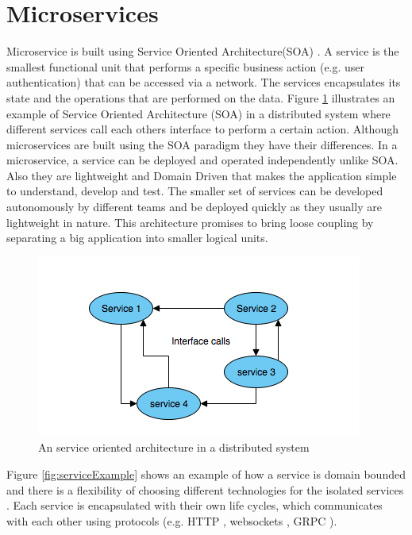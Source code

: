 \newpage
\section{Microservices}

Microservice is built using Service Oriented Architecture(SOA) \cite[chapter ~3]{SOA}. A service 
is the smallest functional unit that performs a specific business action (e.g. user authentication) that can be accessed via a network. 
The services encapsulates its state and the operations that are performed on the data.  
Figure \ref{fig:objectBasedDS} illustrates an example of Service Oriented Architecture (SOA) in a distributed system where different services call each others interface
to perform a certain action. Although microservices are built using the SOA paradigm they have their differences. In a microservice, a service can be deployed and 
operated independently unlike SOA.
Also they are lightweight and Domain Driven \cite{DDD} that makes the application simple to understand, develop and test. The smaller set of services
can be developed autonomously by different teams and be deployed quickly as they usually are lightweight in nature. This architecture promises to bring loose coupling 
by separating a big application into smaller logical units. 


\begin{figure}[H]
    \centering \includegraphics[scale=0.7]{grafiken/objectBasedDS.png}
    \caption{An service oriented architecture in a distributed system 
        \cite[p.~62]{DistributedSystems}}
    \label{fig:objectBasedDS}
\end{figure}


Figure \ref{fig:serviceExample} shows an example of how 
a service is domain bounded and there is a flexibility of choosing different
technologies for the isolated services \cite{MicroserviceNewMan}. 
Each service is encapsulated with their own life cycles, which communicates with each other using protocols 
(e.g. HTTP \cite{HTTP}, websockets \cite{WebSockets}, GRPC \cite{grpc}). 

